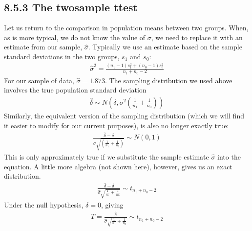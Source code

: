 \documentclass[letterpaper,10pt,english]{jupyterBook}
\begin{document}
\subsection{8.5.3 The two\sphinxhyphen{}sample t\sphinxhyphen{}test}
\label{\detokenize{08.f. Frequentist II:the-two-sample-t-test}}
\sphinxAtStartPar
Let us return to the comparison in population means between two groups. When, as is more typical, we do not know the value of \(\sigma\), we need to replace it with an estimate from our sample, \(\hat{\sigma}\). Typically we use an estimate based on the sample standard deviations in the two groups, \(s_1\) and \(s_0\):
\begin{equation*}
\begin{split}
\hat{\sigma}^2 = \frac{(n_1 - 1) s_1^2 + (n_0 - 1) s_0^2}{n_1 + n_0 - 2}
\end{split}
\end{equation*}
\sphinxAtStartPar
For our sample of data, \(\hat{\sigma} = 1.873\). The sampling distribution we used above involves the true population standard deviation
\begin{equation*}
\begin{split}
\hat{\delta} \sim N\left(\delta, \sigma^2 \left(\frac{1}{n_1} + \frac{1}{n_0} \right) \right)
\end{split}
\end{equation*}
\sphinxAtStartPar
Similarly, the equivalent version of the sampling distribution (which we will find it easier to modify for our current purposes), is also no longer exactly true:
\begin{equation*}
\begin{split}
\frac{\hat{\delta} - \delta}{\sigma \sqrt{\left(\frac{1}{n_1} + \frac{1}{n_0}\right) }}\sim N(0,1)
\end{split}
\end{equation*}
\sphinxAtStartPar
This is only approximately true if we substitute the sample estimate \(\hat{\sigma}\) into the equation. A little more algebra (not shown here), however, gives us an exact distribution.
\begin{equation*}
\begin{split}
\frac{\hat{\delta} -\delta}{\hat{\sigma} \sqrt{\frac{1}{n_1} + \frac{1}{n_0}}} \sim t_{n_1 + n_0 - 2}
\end{split}
\end{equation*}
\sphinxAtStartPar
Under the null hypothesis, \(\delta = 0\), giving
\begin{equation*}
\begin{split}
T = \frac{\hat{\delta}}{\hat{\sigma} \sqrt{\frac{1}{n_1} + \frac{1}{n_0}}} \sim t_{n_1 + n_0 - 2}
\end{split}
\end{equation*}
\end{document}
